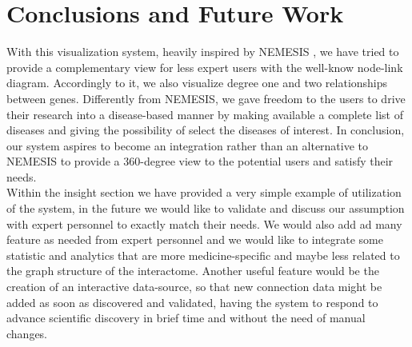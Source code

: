 \documentclass[12pt,twocolumn,twoside]{article}
\begin{document}
	
	
	\section*{Conclusions and Future Work}
	With this visualization system, heavily inspired by NEMESIS \cite{ivapp19}, we have tried to provide a complementary view for less expert users with the well-know node-link diagram. Accordingly to it, we also visualize degree one and two relationships between genes. Differently from NEMESIS, we gave freedom to the users to drive their research into a disease-based manner by making available a complete list of diseases and giving the possibility of select the diseases of interest. In conclusion, our system aspires to become an integration rather than an alternative to NEMESIS to provide a 360-degree view to the potential users and satisfy their needs. \\ Within the insight section we have provided a very simple example of utilization of the system, in the future we would like to validate and discuss our assumption with expert personnel to exactly match their needs. We would also add ad many feature as needed from expert personnel and we would like to integrate some statistic and analytics that are more medicine-specific and maybe less related to the graph structure of the interactome. Another useful feature would be the creation of an interactive data-source, so that new connection data might be added as soon as discovered and validated, having the system to respond to advance scientific discovery in brief time and without the need of manual changes.
	
	
	 
	
\end{document}
